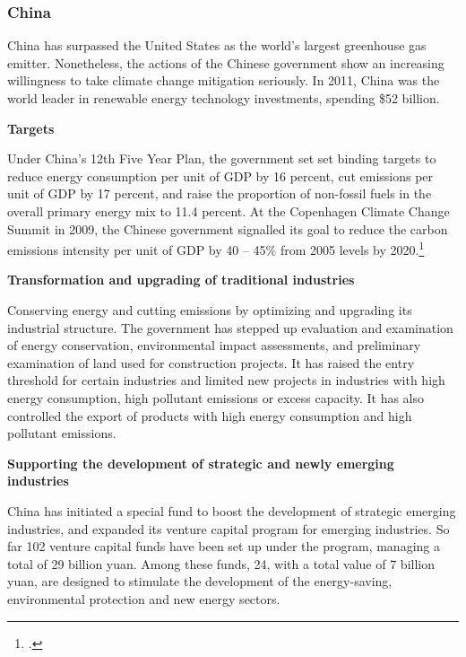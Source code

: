 	\subsubsection{China}
	
	

China has surpassed the United States as the world’s largest greenhouse gas emitter.
Nonetheless, the actions of the Chinese government show an increasing willingness to take climate change mitigation seriously.
In 2011, China was the world leader in renewable energy technology investments, spending \$52 billion.



\textbf{Targets}



Under China's 12th Five Year Plan, the government set set binding targets to reduce energy consumption per unit of GDP by 16 percent, cut  emissions per unit of GDP by 17 percent, and raise the proportion of non-fossil fuels in the overall primary energy mix to 11.4 percent.  
At the Copenhagen Climate Change Summit in 2009, the Chinese government signalled its goal to reduce the carbon emissions intensity per unit of GDP by 40 -- 45\% from 2005 levels by 2020.\footcite[][p. 108]{UNHumanDev2013}



\textbf{Transformation and upgrading of traditional industries}



Conserving energy and cutting emissions by optimizing and upgrading its industrial structure. 
The government has stepped up evaluation and examination of energy conservation, environmental impact assessments, and preliminary examination of land used for construction projects. 
It has raised the entry threshold for certain industries and limited new projects in industries with high energy consumption, high pollutant emissions or excess capacity. 
It has also controlled the export of products with high energy consumption and high pollutant emissions. 



\textbf{Supporting the development of strategic and newly emerging industries}



China has initiated a special fund to boost the development of strategic emerging industries, and expanded its venture capital program for emerging industries. 
So far 102 venture capital funds have been set up under the program, managing a total of 29 billion yuan. 
Among these funds, 24, with a total value of 7 billion yuan, are designed to stimulate the development of the energy-saving, environmental protection and new energy sectors.




